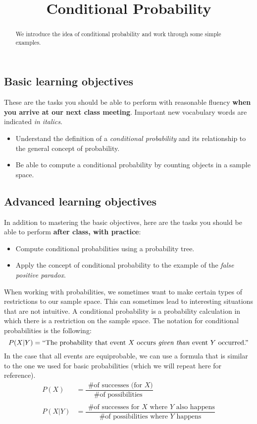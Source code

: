 \documentclass[table]{ximera}
\title{Conditional Probability}
\begin{document}
\begin{abstract}
We introduce the idea of conditional probability and work through some simple examples.
\end{abstract}
\maketitle

\subsection*{Basic learning objectives}

These are the tasks you should be able to perform with reasonable fluency \textbf{when you arrive at our next class meeting}. Important new vocabulary words are indicated \emph{in italics}. 

\begin{itemize}
	\item Understand the definition of a \emph{conditional probability} and its relationship to the general concept of probability.
    \item Be able to compute a conditional probability by counting objects in a sample space.
\end{itemize}

\subsection*{Advanced learning objectives}

In addition to mastering the basic objectives, here are the tasks you should be able to perform \textbf{after class, with practice}: 

\begin{itemize}
    \item Compute conditional probabilities using a probability tree.
    \item Apply the concept of conditional probability to the example of the \emph{false positive paradox}.
\end{itemize}

\noindent\hrulefill

When working with probabilities, we sometimes want to make certain types of restrictions to our sample space. This can sometimes lead to interesting situations that are not intuitive. A conditional probability is a probability calculation in which there is a restriction on the sample space. The notation for conditional probabilities is the following:
\[ P(X | Y) = \text{``The probability that event $X$ occurs \emph{given than} event $Y$ occurred.''} \]
In the case that all events are equiprobable, we can use a formula that is similar to the one we used for basic probabilities (which we will repeat here for reference).
\begin{align*}
  P(X) & = \dfrac{ \text{ \# of successes (for $X$)}}{ \text{\# of possibilities } } \\ \\
  P(X | Y) & = \dfrac{ \text{ \# of successes for $X$ where $Y$ also happens}}{ \text{\# of possibilities where $Y$ happens}}
\end{align*}
\end{document}
